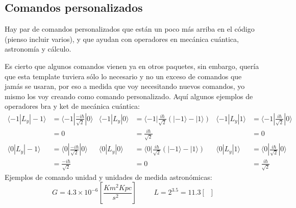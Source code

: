 \documentclass[11pt,letterpaper]{article}
\DeclareMathOperator{\lsol}{L_\odot}               %
\DeclareMathOperator{\msol}{M_\odot}               %
\newcommand{\units}[1]{\left[ #1 \right]}          %
\newcommand{\bra}[1]{\langle #1 |}                 %
\newcommand{\ket}[1]{| #1 \rangle}                 %
\begin{document}
\subsection*{Comandos personalizados}

Hay par de comandos personalizados que están un poco más arriba en el código (pienso incluir varios), y que ayudan con operadores en mecánica cuántica, astronomía y cálculo.\par

Es cierto que algunos comandos vienen ya en otros paquetes, sin embargo, quería que esta template tuviera sólo lo necesario y no un exceso de comandos que jamás se usaran, por eso a medida que voy necesitando nuevos comandos, yo mismo los voy creando como comando personalizado. Aquí algunos ejemplos de operadores bra y ket de mecánica cuántica:
\begin{align*}
    \bra{-1}L_y\ket{-1} &= \bra{-1}\frac{-i\hbar}{\sqrt{2}}\ket{0} & \bra{-1}L_y\ket{0} &= \bra{-1}\frac{i\hbar}{\sqrt{2}}(\ket{-1} - \ket{1}) & \bra{-1}L_y\ket{1} &= \bra{-1}\frac{i\hbar}{\sqrt{2}}\ket{0}\\
     &= 0 & &= \frac{i\hbar}{\sqrt{2}} & &= 0\\
    \bra{0}L_y\ket{-1} &= \bra{0}\frac{-i\hbar}{\sqrt{2}}\ket{0} & \bra{0}L_y\ket{0} &= \bra{0}\frac{i\hbar}{\sqrt{2}}(\ket{-1} - \ket{1}) & \bra{0}L_y\ket{1} &= \bra{0}\frac{i\hbar}{\sqrt{2}}\ket{0}\\
     &= \frac{-i\hbar}{\sqrt{2}} & &= 0 & &= \frac{i\hbar}{\sqrt{2}}
\end{align*}
Ejemplos de comando unidad y unidades de medida astronómicas:
\begin{equation*}
    G = 4.3\times10^{-6}\units{\frac{Km^2Kpc}{s^2\msol}} \hspace{1cm} L = 2^{3.5} = 11.3 \units{\lsol}
\end{equation*}
\end{document}
